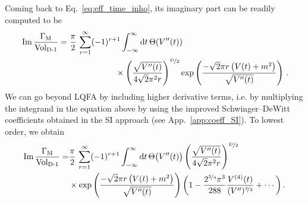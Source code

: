 \documentclass[12pt,a4paper]{article}
\numberwithin{equation}{section}
\numberwithin{equation}{section}
\begin{document}
Coming back to Eq.~\eqref{eq:eff_time_inho}, its imaginary part can be readily computed to be
\begin{align}
 \begin{split} &\operatorname{Im} \frac{\Gamma_{\rm M}}{\operatorname{Vol_{\rm D-1}}}   = \frac{\pi}{2} \, \sum_{r=1}^{\infty} (-1)^{r+1}  \int^{\infty}_{-\infty} {\rm d}t\,  \Theta(V''(t))
  \\
 &\hspace{4cm}\times \left(\frac{\sqrt{V''(t)} }{ 4 \sqrt{2} \pi^2  r }\right)^{\nicefrac{D}{2}}  \mathrm{exp}\left(\frac{-\sqrt{2}\pi r\left(V(t)+m^2\right)}{\sqrt{V''(t)}}\right)\, .
\end{split}
\end{align}
 We can go beyond LQFA  by including higher derivative terms, i.e. by multiplying the integrand in the equation above by using the improved Schwinger--DeWitt coefficients obtained in the SI approach (see App.~\ref{app:coeff_SI}). To lowest order,  we obtain
\begin{align}
\begin{split}\label{eq:im_time_inho}
  \operatorname{Im} \frac{\Gamma_{\rm M}}{\operatorname{Vol_{\rm D-1}}}=& \frac{\pi}{2} \,
\sum_{r=1}^{\infty} (-1)^{r+1} \int^{\infty}_{-\infty} {\rm d}t\,  \Theta\big(V''(t)\big) \left(\frac{\sqrt{V''(t)} }{ 4\sqrt{2}\pi^2 r}\right)^{\nicefrac{D}{2}}   \\
& \times \mathrm{exp}\left(\frac{-\sqrt{2} \pi r\left(V(t)+m^2\right)}{\sqrt{V''(t)}}\right) \left(1-\frac{2^{\nicefrac{3}{4}}\pi^3}{288} \frac{V^{(4)}(t)}{(V'')^{\nicefrac{3}{2}}}+\cdots\right).
\end{split}
\end{align}
\end{document}
